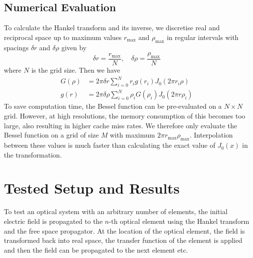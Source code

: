 \subsection{Numerical Evaluation}
To calculate the Hankel transform and its inverse, we discretise real and reciprocal space up to maximum values $r_\text{max}$ and $\rho_\text{max}$ in regular intervals with spacings $\delta r$ and $\delta \rho$ given by
\[
    \delta r = \frac{r_\text{max}}{N}, \quad \delta \rho = \frac{\rho_\text{max}}{N}
\]
where $N$ is the grid size.
Then we have
\begin{align}
    G(\rho) &= 2\pi \delta r \sum_{i = 0}^N r_i  g(r_i) J_0(2\pi r_i \rho) \\
    g(r) &= 2\pi \delta \rho \sum_{i = 0}^N \rho_i  G(\rho_i) J_0(2\pi r \rho_i)
\end{align}
To save computation time, the Bessel function can be pre-evaluated on a $N\times N$ grid. However, at high resolutions, the memory consumption of this becomes too large, also resulting in higher cache miss rates. We therefore only evaluate the Bessel function on a grid of size $M$ with maximum $2\pi r_\text{max} \rho_\text{max}$. Interpolation between these values is much faster than calculating the exact value of $J_0(x)$ in the transformation.


\section{Tested Setup and Results}
To test an optical system with an arbitrary number of elements, the initial electric field is propagated to the $n$-th optical element using the Hankel transform and the free space propagator. At the location of the optical element, the field is transformed back into real space, the transfer function of the element is applied and then the field can be propagated to the next element etc.

